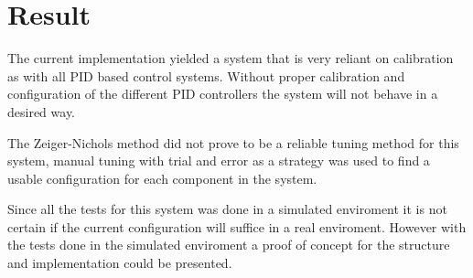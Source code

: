 \section{Result}\label{sec:result}

The current implementation yielded a system that is very reliant on calibration as with all PID based control systems. Without proper calibration and configuration of the different PID controllers the system will not behave in a desired way. 

The Zeiger-Nichols method \cite{web:zeiger-nichols}  did not prove to be a reliable tuning method for this system, manual tuning with trial and error as a strategy was used to find a usable configuration for each component in the system.

Since all the tests for this system was done in a simulated enviroment it is not certain if the current configuration will suffice in a real enviroment. However with the tests done in the simulated enviroment a proof of concept for the structure and implementation could be presented.
